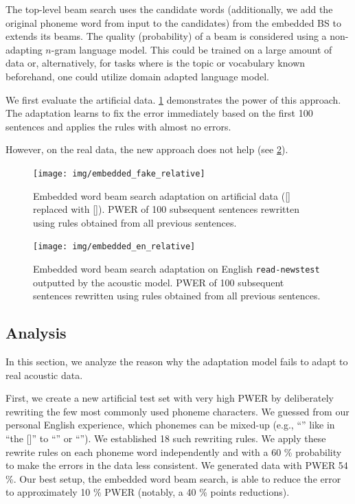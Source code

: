 The top-level beam search uses the candidate words (additionally, we add the original phoneme word from input to the candidates) from the embedded BS to extends its beams. The quality (probability) of a beam is considered using a non-adapting $n$-gram language model. This could be trained on a large amount of data or, alternatively, for tasks where is the topic or vocabulary known beforehand, one could utilize domain adapted language model. 

We first evaluate the artificial data. \cref{fig:embedded} demonstrates the power of this approach. The adaptation learns to fix the error immediately based on the first 100 sentences and applies the rules with almost no errors.

However, on the real data, the new approach does not help (see \cref{fig:embedded_en}). 

\begin{figure}[h]
    \texttt{[image: img/embedded\_fake\_relative]}
    \caption{Embedded word beam search  adaptation on artificial data ([] replaced with []). PWER of 100 subsequent sentences rewritten using rules obtained from all previous sentences.}
    \label{fig:embedded} 
\end{figure}

\begin{figure}[h]
    \texttt{[image: img/embedded\_en\_relative]}
    \caption{Embedded word beam search adaptation on English \texttt{read-newstest} outputted by the acoustic model. PWER of 100 subsequent sentences rewritten using rules obtained from all previous sentences.}
    \label{fig:embedded_en} 
\end{figure}


\subsection{Analysis}
In this section, we analyze the reason why the adaptation model fails to adapt to real acoustic data.

First, we create a new artificial test set with very high PWER by deliberately rewriting the few most commonly used phoneme characters. We guessed from our personal English experience, which phonemes can be mixed-up (e.g., ``'' like in ``the []'' to ``'' or ``''). We established 18 such rewriting rules. We apply these rewrite rules on each phoneme word independently and with a 60 \% probability to make the errors in the data less consistent. We generated data with PWER 54 \%. Our best setup, the embedded word beam search, is able to reduce the error to approximately 10 \% PWER (notably, a 40 \% points reductions).  

